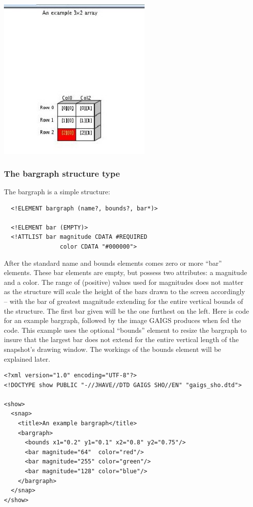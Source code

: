 \documentclass[12pt]{article}
\begin{document}
\begin{center}
  \includegraphics[width=3in]{howto_graphics/array.eps}
\end{center}


\subsubsection{The bargraph structure type}


The bargraph is a simple structure:

\footnotesize \begin{verbatim}
  <!ELEMENT bargraph (name?, bounds?, bar*)>

  <!ELEMENT bar (EMPTY)>
  <!ATTLIST bar magnitude CDATA #REQUIRED
                color CDATA "#000000">
\end{verbatim} \normalsize
  
  After the standard name and bounds elements comes zero or more
  ``bar'' elements. These bar elements are empty, but possess two
  attributes: a magnitude and a color. The range of (positive) values
  used for magnitudes does not matter as the structure will scale the
  height of the bars drawn to the screen accordingly -- with the bar
  of greatest magnitude extending for the entire vertical bounds of
  the structure. The first bar given will be the one furthest on the
  left. Here is code for an example bargraph, followed by the image
  GAIGS produces when fed the code. This example uses the optional
  ``bounds'' element to resize the bargraph to insure that the largest
  bar does not extend for the entire vertical length of the snapshot's
  drawing window. The workings of the bounds element will be
  explained later.

\footnotesize \begin{verbatim}
<?xml version="1.0" encoding="UTF-8"?>
<!DOCTYPE show PUBLIC "-//JHAVE//DTD GAIGS SHO//EN" "gaigs_sho.dtd">

<show>
  <snap>
    <title>An example bargraph</title>
    <bargraph>
      <bounds x1="0.2" y1="0.1" x2="0.8" y2="0.75"/>
      <bar magnitude="64"  color="red"/>
      <bar magnitude="255" color="green"/>
      <bar magnitude="128" color="blue"/>
    </bargraph>
  </snap>
</show>
\end{verbatim} \normalsize
\end{document}
